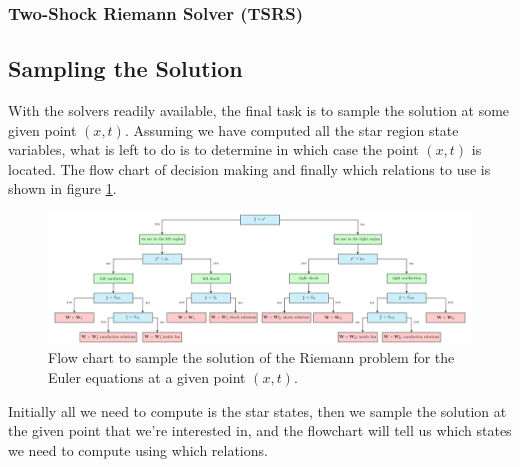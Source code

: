 \subsubsection{Two-Shock Riemann Solver (TSRS)}







\subsection{Sampling the Solution}

With the solvers readily available, the final task is to sample the solution at some given point $(x, t)$.
Assuming we have computed all the star region state variables, what is left to do is to determine in which case the point $(x, t)$ is located.
The flow chart of decision making and finally which relations to use is shown in figure \ref{fig:sampling-solution}.


\begin{figure}
	\includegraphics[]{./figures/tikz/sampling_the_solution.pdf}%
	\caption{Flow chart to sample the solution of the Riemann problem for the Euler equations at a given point $(x, t)$.
		\label{fig:sampling-solution}
	}
\end{figure}

Initially all we need to compute is the star states, then we sample the solution at the given point that we're interested in, and the flowchart will tell us which states we need to compute using which relations.
